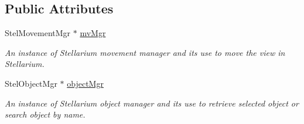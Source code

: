 \subsection*{Public Attributes}
\begin{DoxyCompactItemize}
\item 
Stel\+Movement\+Mgr $\ast$ \hyperlink{class_autoscope_ab34124a1179a937ac061bb4fa3faa2de}{mv\+Mgr}
\begin{DoxyCompactList}\small\item\em An instance of Stellarium movement manager and it\textquotesingle{}s use to move the view in Stellarium. \end{DoxyCompactList}\item 
Stel\+Object\+Mgr $\ast$ \hyperlink{class_autoscope_aec2c452e45c0a7d045417a8656aa7c45}{object\+Mgr}
\begin{DoxyCompactList}\small\item\em An instance of Stellarium object manager and it\textquotesingle{}s use to retrieve selected object or search object by name. \end{DoxyCompactList}\end{DoxyCompactItemize}

